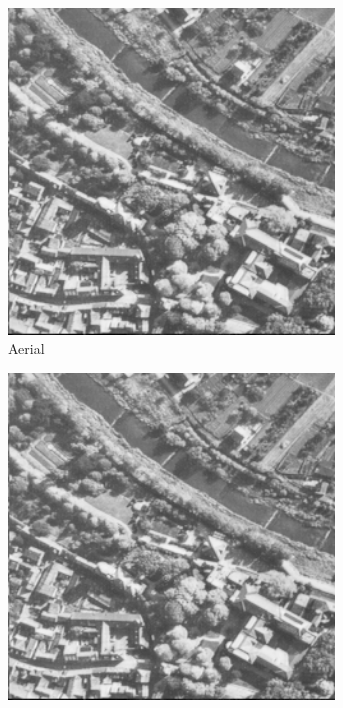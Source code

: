 \begin{figure}
\centering
\begin{subfigure}[b]{.23\textwidth}
  \centering
  \includegraphics[width=0.95\textwidth]{figures/test-images/original/aerial}
  \caption{Aerial}
  \label{fig:test-images-aerial-original}
\end{subfigure}
\begin{subfigure}[b]{.23\textwidth}
  \centering
  \includegraphics[width=0.95\textwidth]{figures/test-images/truncate1/aerial}

\end{subfigure}
\end{figure}
